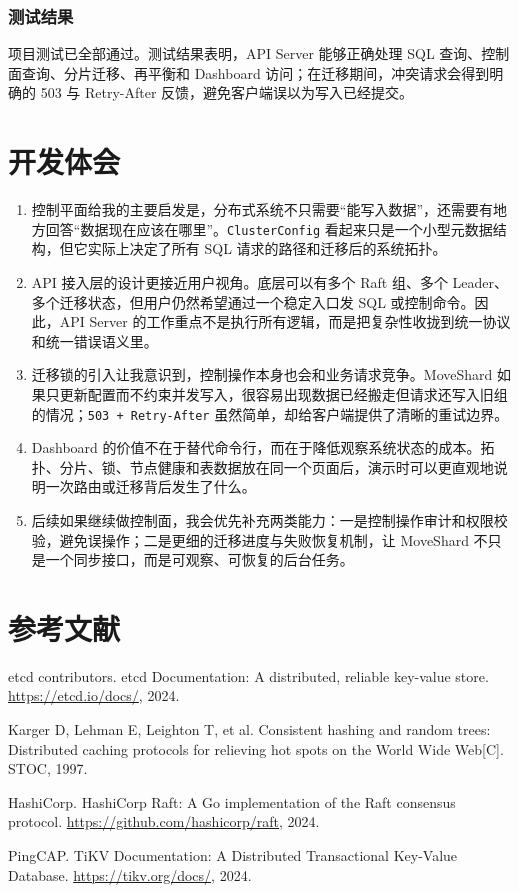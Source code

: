 \documentclass[UTF8,a4paper,12pt]{ctexart}
\begin{document}
\subsubsection{测试结果}

项目测试已全部通过。测试结果表明，API Server 能够正确处理 SQL 查询、控制面查询、分片迁移、再平衡和 Dashboard 访问；在迁移期间，冲突请求会得到明确的 503 与 Retry-After 反馈，避免客户端误以为写入已经提交。

\section{开发体会}

\begin{enumerate}
  \item 控制平面给我的主要启发是，分布式系统不只需要“能写入数据”，还需要有地方回答“数据现在应该在哪里”。\texttt{ClusterConfig} 看起来只是一个小型元数据结构，但它实际上决定了所有 SQL 请求的路径和迁移后的系统拓扑。
  \item API 接入层的设计更接近用户视角。底层可以有多个 Raft 组、多个 Leader、多个迁移状态，但用户仍然希望通过一个稳定入口发 SQL 或控制命令。因此，API Server 的工作重点不是执行所有逻辑，而是把复杂性收拢到统一协议和统一错误语义里。
  \item 迁移锁的引入让我意识到，控制操作本身也会和业务请求竞争。MoveShard 如果只更新配置而不约束并发写入，很容易出现数据已经搬走但请求还写入旧组的情况；\texttt{503 + Retry-After} 虽然简单，却给客户端提供了清晰的重试边界。
  \item Dashboard 的价值不在于替代命令行，而在于降低观察系统状态的成本。拓扑、分片、锁、节点健康和表数据放在同一个页面后，演示时可以更直观地说明一次路由或迁移背后发生了什么。
  \item 后续如果继续做控制面，我会优先补充两类能力：一是控制操作审计和权限校验，避免误操作；二是更细的迁移进度与失败恢复机制，让 MoveShard 不只是一个同步接口，而是可观察、可恢复的后台任务。
\end{enumerate}

\section*{参考文献}

\begin{enumerate}[label={[\arabic*]}, leftmargin=2.8em, itemsep=0.3em]
  \item etcd contributors. etcd Documentation: A distributed, reliable key-value store. \url{https://etcd.io/docs/}, 2024.
  \item Karger D, Lehman E, Leighton T, et al. Consistent hashing and random trees: Distributed caching protocols for relieving hot spots on the World Wide Web[C]. STOC, 1997.
  \item HashiCorp. HashiCorp Raft: A Go implementation of the Raft consensus protocol. \url{https://github.com/hashicorp/raft}, 2024.
  \item PingCAP. TiKV Documentation: A Distributed Transactional Key-Value Database. \url{https://tikv.org/docs/}, 2024.
\end{enumerate}
\end{document}
